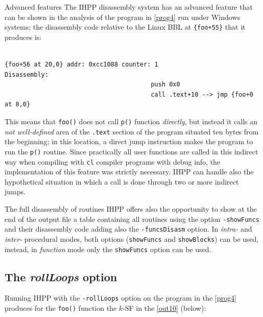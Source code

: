 \documentclass[a4paper,10pt]{report}
\begin{document}
\begin{paragraph}{Advanced features}
The IHPP disassembly system has an advanced feature that can be shown in
the analysis of the program in \cref{prog4} run under Windows systems;
the disassembly code relative 
to the Linux BBL at \verb|{foo+55}| that it produces is:
\begin{lstlisting}[language={[x86masm]Assembler}, 
	label=out92, caption={an example of a two-step call}, frame=bottomline]

{foo+56 at 20,0} addr: 0xcc1088 counter: 1	
Disassembly: 
										push 0x0
										call .text+10 --> jmp {foo+0 at 8,0}
\end{lstlisting}

This means that \verb|foo()| does not call \verb|p()| function \emph{directly}, 
but instead it calls an \emph{not well-defined} 
area of the \verb|.text| section of the program 
situated ten bytes from the beginning; in this location, a direct jump instruction
makes the program to run the \verb|p()| routine. Since practically all user functions
are called in this indirect way when compiling with \verb|cl| compiler 
programs with debug info, the implementation 
of this feature was strictly necessary. IHPP can handle also
the hypothetical situation in which a call is done through two or more indirect jumps.
\end{paragraph}

\begin{paragraph}{The full disassembly of routines}
IHPP offers also the opportunity to show at the end of the output file 
a table containing all routines using the option \verb|-showFuncs| and their 
disassembly code adding also the \verb|-funcsDisasm| option.  
In \emph{intra-} and \emph{inter-} procedural modes, both options (\verb|showFuncs| and \verb|showBlocks|) can be used, instead, in \emph{function} mode 
only the \verb|showFuncs| option can be used.
\end{paragraph}

\subsection{The \emph{rollLoops} option}

Running IHPP with the \verb|-rollLoops| option on the program in the \cref{prog4}
produces for the \verb|foo()| function the $k$-SF in the \cref{out10} (below):
\end{document}
